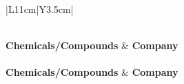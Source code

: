 \begin{longtable}{|L{11cm}|Y{3.5cm}|}
    \caption{\textbf{Incomplete list of chemicals, solutions, reaction buffers, and other compounds used in this work.} Any chemicals, solutions, and others not mentioned in the previous tables are listed here.}
    \label{tab:chemical_list}
    \\
        \hline
        \textbf{Chemicals/Compounds}   & \textbf{Company} \\
        \hline
    \endfirsthead
         \\
        \hline 
        \textbf{Chemicals/Compounds}   & \textbf{Company}  \\
        \hline
    \endhead
        \hline
         \\ 
    \endfoot
    \hline
    \endlastfoot


\end{longtable}
